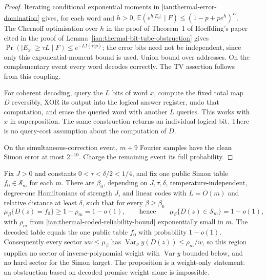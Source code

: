 \begin{proof}
Iterating conditional exponential moments in
\eqref{ian:thermal-error-domination} gives, for each word and \(h>0\),
\(\mathbb E(e^{h|E_x|}\mid F)\le(1-p+pe^h)^L\).
The Chernoff optimisation over \(h\) in the proof of Theorem~1 of
Hoeffding's paper cited in the proof of
Lemma~\ref{ian:thermal-bit-tube-obstruction} gives
\(\Pr(|E_x|\ge\tau L\mid F)\le e^{-LI(\tau\Vert p)}\);
the error bits need not be independent, since only this
exponential-moment bound is used.
Union bound over addresses. On the complementary event every word
decodes correctly. The TV assertion follows from this coupling.

For coherent decoding, query the \(L\) bits of word \(x\), compute
the fixed total map \(D\) reversibly, XOR its output into the logical
answer register, undo that computation, and erase the queried word
with another \(L\) queries. This works with \(x\) in superposition.
The same construction returns an individual logical bit.
There is no query-cost assumption about the computation of \(D\).

On the simultaneous-correction event, \(m+9\) Fourier samples have
the clean Simon error at most \(2^{-10}\). Charge the remaining
event its full probability.
\end{proof}

\begin{proposition}
\label{ian:thermal-coded-promise-weight}
Fix \(J>0\) and constants \(0<\tau<\delta/2<1/4\), and fix one public
Simon table \(f_0\in\mathcal S_m\) for each \(m\). There are
\(\beta_0\), depending on \(J,\tau,\delta\), temperature-independent,
degree-one Hamiltonians of strength \(J\), and linear codes with
\(L=O(m)\) and relative distance at least \(\delta\), such that for
every \(\beta\ge\beta_0\)
\[
 \mu_\beta\{D(z)=f_0\}\ge1-\rho_m=1-o(1),
 \qquad\text{hence}\qquad
 \mu_\beta\{D(z)\in\mathcal S_m\}=1-o(1),
\]
with \(\rho_m\) from \eqref{ian:thermal-coded-reliability-bound}
exponentially small in \(m\).
The decoded table equals the one public table \(f_0\) with
probability \(1-o(1)\). Consequently every sector
\(w\nu\le\mu_\beta\) has
\(\operatorname{Var}_\nu y(D(z))\le\rho_m/w\), so this region supplies
no sector of inverse-polynomial weight with \(\operatorname{Var}y\)
bounded below, and no hard sector for the Simon target.
The proposition is a weight-only statement: an obstruction based on
decoded promise weight alone is impossible.
\end{proposition}

